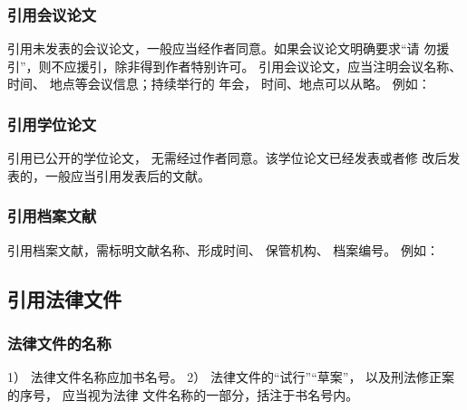 \documentclass{article}
\begin{document}
\subsubsection{引用会议论文}
引用未发表的会议论文，一般应当经作者同意。如果会议论文明确要求“请
勿援引”，则不应援引，除非得到作者特别许可。
引用会议论文，应当注明会议名称、 时间、 地点等会议信息；持续举行的
年会， 时间、地点可以从略。
例如：
\begin{quotation}
\end{quotation}


\subsubsection{引用学位论文}
引用已公开的学位论文， 无需经过作者同意。该学位论文已经发表或者修
改后发表的，一般应当引用发表后的文献。
\begin{quotation}
\end{quotation}


\subsubsection{引用档案文献}
引用档案文献，需标明文献名称、形成时间、 保管机构、 档案编号。
例如：

\begin{quotation}
\end{quotation}


\subsection{引用法律文件}

\subsubsection{法律文件的名称}
1） 法律文件名称应加书名号。
2） 法律文件的“试行”“草案”， 以及刑法修正案的序号， 应当视为法律
文件名称的一部分，括注于书名号内。

\begin{quotation}
\end{quotation}
\end{document}
